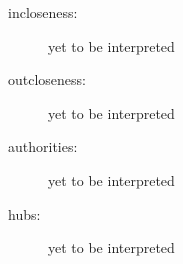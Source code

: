 \begin{description}

	\item[incloseness:] yet to be interpreted

	\item[outcloseness:] yet to be interpreted

	\item[authorities:] yet to be interpreted

	\item[hubs:] yet to be interpreted

\end{description}


% 





